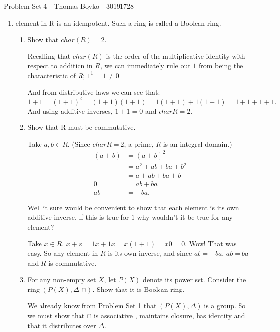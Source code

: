 \documentclass{article}
\begin{document}
    \huge Problem Set 4 - Thomas Boyko - 30191728
    \normalsize
\begin{enumerate} 

\item %
element in R is an idempotent. Such a ring is called a Boolean ring.
\begin{enumerate}[label= (\alph*)] 
    \item Show that $char(R) = 2$.

        Recalling that $char(R)$ is the order of the multiplicative identity with respect to addition in $R$, we can 
        immediately rule out $1$ from being the characteristic of $R$; $1^1=1\neq 0$.

        And from distributive laws we can see that:
        \[
        1+1=(1+1)^2=(1+1)(1+1)=1(1+1)+1(1+1)=1+1+1+1
        .\] 
        And using additive inverses,
        $1+1=0$ and $char R=2$.

    \item Show that R must be commutative.

        Take $a,b\in R$. (Since $char R=2$, a prime, $R$ is an integral domain.)
        \begin{align*}
            (a+b)&= (a+b)^2 \\
            &= a^2+ab+ba+b^2 \\
            &= a+ab+ba +b\\
            0&= ab+ba \\
            ab&= -ba 
        .\end{align*}

        Well it sure would be convenient to show that each element is its own additive inverse. If this is true
        for $1$ why wouldn't it be true for any element? 

        Take $x\in R$. $x+x=1x+1x=x(1+1)=x 0 =0$. Wow! That was easy. So any element in $R$ is its own inverse, and
        since $ab=-ba$, $ab=ba$ and $R$ is commutative.

    \item For any non-empty set $X$, let $P(X)$ denote its power
    set. Consider the ring $(P(X), \Delta, \cap )$. Show that it is Boolean ring.

    We already know from Problem Set 1 that $(P(X),\Delta)$ is a group. So we must show that $\cap $ is associative
    , maintains closure, has identity and that it distributes over $\Delta$.


\end{enumerate}
\end{enumerate}
\end{document}
